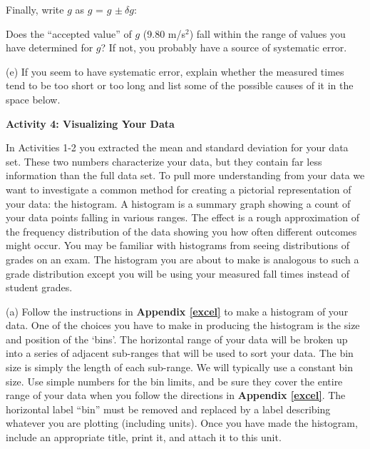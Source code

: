 

Finally, write $g$ as $g$ = $g$ \(\pm\ \delta g\):

Does the ``accepted value'' of $g$ (9.80 m/s$^2$) fall within the range of 
values you have determined for $g$? If not, you probably have a source of 
systematic error.

(e) If you seem to have systematic error, explain whether the measured times
tend to be too short or too long and list some of the possible causes of it
in the space below.
\vspace{30mm}

\textbf{Activity 4: Visualizing Your Data}

In Activities 1-2 you extracted the mean and standard deviation for your data set. 
These two numbers characterize your data, but they contain far less information than the full
data set.
To pull more understanding from your data we want to investigate a common method for
creating a pictorial representation of your data: the histogram.
A histogram is a summary graph showing a count of your data points falling in various ranges. 
The effect is a rough approximation of the frequency distribution of the data showing you how often different outcomes might occur.
You may be familiar with histograms from seeing distributions of grades on an exam.
The histogram you are about to make is analogous to such a grade distribution except you will be using your measured fall times
instead of student grades.

(a) Follow the instructions in \textbf{Appendix \ref{excel}} to make a histogram of your data. 
One of the choices you have to make in producing the histogram is the size and position of the `bins'.
The horizontal range of your data will be broken up into a series of adjacent sub-ranges that will be used to sort your data. The bin size is simply the length of each sub-range. 
We will typically use a constant bin size.
Use simple numbers for the bin limits, and be sure they cover the entire range of your data when you follow the directions in \textbf{Appendix \ref{excel}}.  The horizontal label ``bin'' must be removed and replaced by a label describing whatever you are plotting (including units).
Once you have made the histogram, include an appropriate title, print it, and attach it to this unit.
\vspace{2mm}

